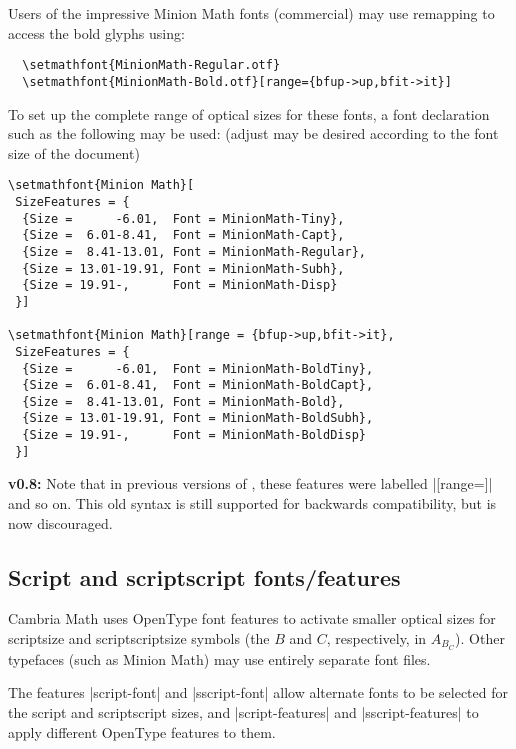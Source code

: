 
Users of the impressive Minion Math fonts (commercial) may use remapping to access the bold glyphs using:
\begin{Verbatim}
  \setmathfont{MinionMath-Regular.otf}
  \setmathfont{MinionMath-Bold.otf}[range={bfup->up,bfit->it}]
\end{Verbatim}
To set up the complete range of optical sizes for these fonts, a font declaration such as the following may be used: (adjust may be desired according to the font size of the document)
\begin{Verbatim}
\setmathfont{Minion Math}[
 SizeFeatures = {
  {Size =      -6.01,  Font = MinionMath-Tiny},
  {Size =  6.01-8.41,  Font = MinionMath-Capt},
  {Size =  8.41-13.01, Font = MinionMath-Regular},
  {Size = 13.01-19.91, Font = MinionMath-Subh},
  {Size = 19.91-,      Font = MinionMath-Disp}
 }]

\setmathfont{Minion Math}[range = {bfup->up,bfit->it},
 SizeFeatures = {
  {Size =      -6.01,  Font = MinionMath-BoldTiny},
  {Size =  6.01-8.41,  Font = MinionMath-BoldCapt},
  {Size =  8.41-13.01, Font = MinionMath-Bold},
  {Size = 13.01-19.91, Font = MinionMath-BoldSubh},
  {Size = 19.91-,      Font = MinionMath-BoldDisp}
 }]
\end{Verbatim}
\textbf{v0.8:} Note that in previous versions of , these features were labelled |[range=\mathbb]| and so on. This old syntax is still supported for backwards compatibility, but is now discouraged.


\subsection{Script and scriptscript fonts/features}

Cambria Math uses OpenType font features to activate smaller optical sizes
for scriptsize and scriptscriptsize symbols (the $B$ and $C$, respectively,
in $A_{B_C}$).
Other typefaces (such as Minion Math) may use entirely separate font files.

The features |script-font| and |sscript-font| allow alternate fonts to be
selected for the script and scriptscript sizes, and |script-features| and
|sscript-features| to apply different OpenType features to them.

